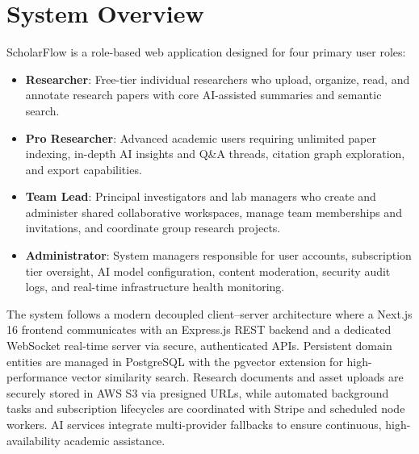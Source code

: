 \section{System Overview}
ScholarFlow is a role-based web application designed for four primary user roles:
\begin{itemize}[nosep]
\item \textbf{Researcher}: Free-tier individual researchers who upload, organize, read, and annotate research papers with core AI-assisted summaries and semantic search.
\item \textbf{Pro Researcher}: Advanced academic users requiring unlimited paper indexing, in-depth AI insights and Q\&A threads, citation graph exploration, and export capabilities.
\item \textbf{Team Lead}: Principal investigators and lab managers who create and administer shared collaborative workspaces, manage team memberships and invitations, and coordinate group research projects.
\item \textbf{Administrator}: System managers responsible for user accounts, subscription tier oversight, AI model configuration, content moderation, security audit logs, and real-time infrastructure health monitoring.
\end{itemize}

The system follows a modern decoupled client--server architecture where a Next.js 16 frontend communicates with an Express.js REST backend and a dedicated WebSocket real-time server via secure, authenticated APIs. Persistent domain entities are managed in PostgreSQL with the pgvector extension for high-performance vector similarity search. Research documents and asset uploads are securely stored in AWS S3 via presigned URLs, while automated background tasks and subscription lifecycles are coordinated with Stripe and scheduled node workers. AI services integrate multi-provider fallbacks to ensure continuous, high-availability academic assistance.
